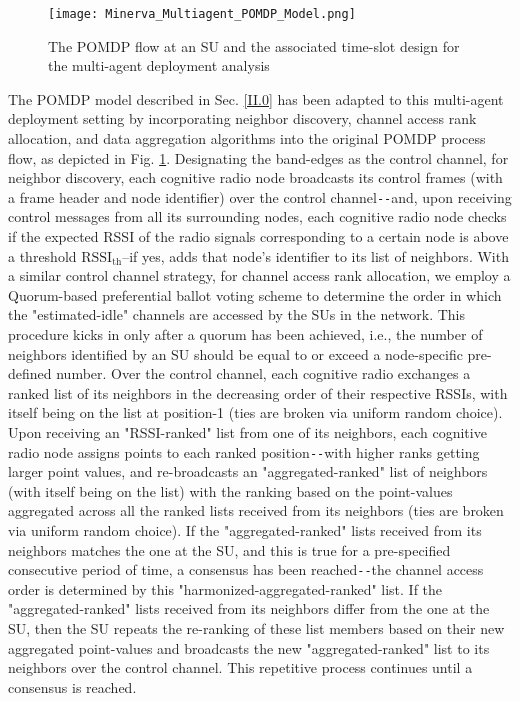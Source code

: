 \documentclass[12pt, draftcls, onecolumn]{IEEEtran}
\begin{document}
\begin{figure} [htb]
    \centerline{
    \texttt{[image: Minerva\_Multiagent\_POMDP\_Model.png]}}
    \caption{The POMDP flow at an SU and the associated time-slot design for the multi-agent deployment analysis}
    \label{fig: Z. 1}
\end{figure}
The POMDP model described in Sec. \ref{II.0} has been adapted to this multi-agent deployment setting by incorporating neighbor discovery, channel access rank allocation, and data aggregation algorithms into the original POMDP process flow, as depicted in Fig. \ref{fig: Z. 1}. Designating the band-edges as the control channel, for neighbor discovery, each cognitive radio node broadcasts its control frames (with a frame header and node identifier) over the control channel\texttt{-{}-}and, upon receiving control messages from all its surrounding nodes, each cognitive radio node checks if the expected RSSI of the radio signals corresponding to a certain node is above a threshold $\text{RSSI}_\text{th}$--if yes, adds that node’s identifier to its list of neighbors. With a similar control channel strategy, for channel access rank allocation, we employ a Quorum-based preferential ballot voting scheme to determine the order in which the "estimated-idle" channels are accessed by the SUs in the network. This procedure kicks in only after a quorum has been achieved, i.e., the number of neighbors identified by an SU should be equal to or exceed a node-specific pre-defined number. Over the control channel, each cognitive radio exchanges a ranked list of its neighbors in the decreasing order of their respective  RSSIs, with itself being on  the list at position-1 (ties are broken via uniform random choice). Upon receiving an "RSSI-ranked" list from one of its neighbors, each cognitive radio node assigns points to each ranked position\texttt{-{}-}with higher ranks getting larger point values, and re-broadcasts an  "aggregated-ranked" list of neighbors (with itself being on the list) with the ranking based on the point-values aggregated across all the ranked lists received from its neighbors (ties are broken via uniform random choice). If the "aggregated-ranked" lists received from its neighbors matches the one at the SU, and this is true for a pre-specified consecutive period of time, a consensus has been reached\texttt{-{}-}the channel access order is determined by this "harmonized-aggregated-ranked" list. If the "aggregated-ranked" lists received from its neighbors differ from the one at the SU, then  the SU repeats the re-ranking of these list members based on their new aggregated point-values and broadcasts the new "aggregated-ranked" list to its neighbors over the control channel. This repetitive process continues until a consensus is reached.
\end{document}
